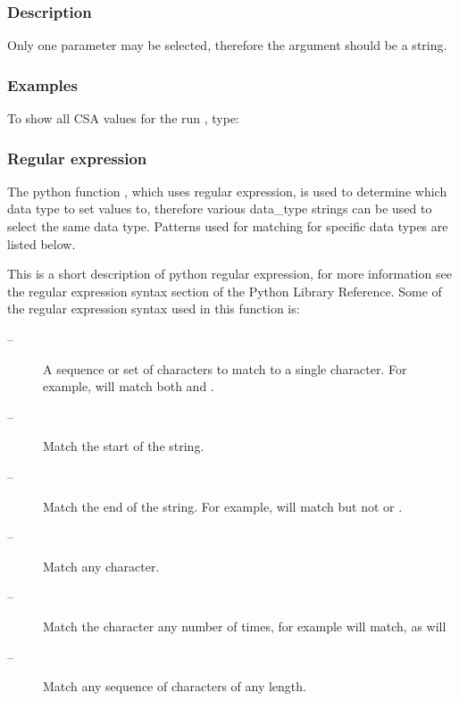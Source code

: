   

  
 \subsubsection{Description} 

 Only one parameter may be selected, therefore the  argument should be a string. 
  

  
 \subsubsection{Examples} 

 To show all CSA values for the run , type: 
  


  
 \subsubsection{Regular expression} 

 The python function , which uses regular expression, is used to determine which data type to set values to, therefore various data\_type strings can be used to select the same data type.  Patterns used for matching for specific data types are listed below. 
  

 This is a short description of python regular expression, for more information see the regular expression syntax section of the Python Library Reference.  Some of the regular expression syntax used in this function is: 
  

 \begin{description} 
 \item[\quotecmd{[]} --]  A sequence or set of characters to match to a single character.  For example,  will match both  and .  
 \item[\quotecmd{\^{}} --]  Match the start of the string.  
 \item[\quotecmd{\$} --]  Match the end of the string.  For example,  will match  but not  or .  
 \item[ --]  Match any character.  
 \item[ --]  Match the character  any number of times, for example  will match, as will   
 \item[ --]  Match any sequence of characters of any length.  
 \end{description} 
  

